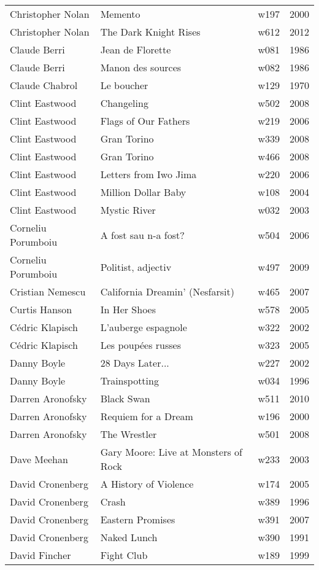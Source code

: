 \documentclass{article}
\begin{document}
\begin {center}
\begin{longtable}{l p{10cm} l l}
Christopher Nolan & Memento & w197 & 2000 \\
Christopher Nolan & The Dark Knight Rises & w612 & 2012 \\
Claude Berri & Jean de Florette & w081 & 1986 \\
Claude Berri & Manon des sources & w082 & 1986 \\
Claude Chabrol & Le boucher & w129 & 1970 \\
Clint Eastwood & Changeling & w502 & 2008 \\
Clint Eastwood & Flags of Our Fathers & w219 & 2006 \\
Clint Eastwood & Gran Torino & w339 & 2008 \\
Clint Eastwood & Gran Torino & w466 & 2008 \\
Clint Eastwood & Letters from Iwo Jima & w220 & 2006 \\
Clint Eastwood & Million Dollar Baby & w108 & 2004 \\
Clint Eastwood & Mystic River & w032 & 2003 \\
Corneliu Porumboiu & A fost sau n-a fost? & w504 & 2006 \\
Corneliu Porumboiu & Politist, adjectiv & w497 & 2009 \\
Cristian Nemescu & California Dreamin' (Nesfarsit) & w465 & 2007 \\
Curtis Hanson & In Her Shoes & w578 & 2005 \\
Cédric Klapisch & L'auberge espagnole & w322 & 2002 \\
Cédric Klapisch & Les poupées russes & w323 & 2005 \\
Danny Boyle & 28 Days Later... & w227 & 2002 \\
Danny Boyle & Trainspotting & w034 & 1996 \\
Darren Aronofsky & Black Swan & w511 & 2010 \\
Darren Aronofsky & Requiem for a Dream & w196 & 2000 \\
Darren Aronofsky & The Wrestler & w501 & 2008 \\
Dave Meehan & Gary Moore: Live at Monsters of Rock & w233 & 2003 \\
David Cronenberg & A History of Violence & w174 & 2005 \\
David Cronenberg & Crash & w389 & 1996 \\
David Cronenberg & Eastern Promises & w391 & 2007 \\
David Cronenberg & Naked Lunch & w390 & 1991 \\
David Fincher & Fight Club & w189 & 1999 \\

\end{longtable}
\end{center}
\end{document}
